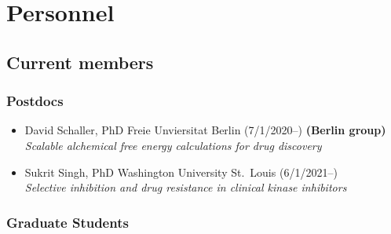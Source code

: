 \documentclass[10pt]{article}
\begin{document}
\section*{Personnel}

\subsection*{Current members}

\subsubsection*{Postdocs}

\begin{itemize}
  \item David Schaller, PhD Freie Unviersitat Berlin (7/1/2020--) {\bf (Berlin group)}\\
  \emph{Scalable alchemical free energy calculations for drug discovery}

  \item Sukrit Singh, PhD Washington University St.\ Louis (6/1/2021--) \\
  \emph{Selective inhibition and drug resistance in clinical kinase inhibitors}

\end{itemize}

\subsubsection*{Graduate Students}
\end{document}

